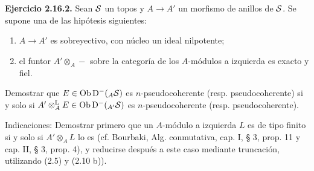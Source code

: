 \textbf{Ejercicio 2.16.2.} Sean \(\sisi{S}{\mathcal S}\) un topos y \(A\to A'\) un morfismo de anillos de \(\sisi{S}{\mathcal S}\). Se supone una de las hipótesis siguientes:
\begin{enumerate}[label=(\roman*)]
\item \(A\to A'\) es sobreyectivo, con núcleo un ideal nilpotente;
\item el funtor \(A'\otimes_A-\) sobre la categoría de los \(A\)-módulos a izquierda es exacto y fiel.
\end{enumerate}
Demostrar que \(E\in\Ob\Dpx^-(_A \sisi{S}{\mathcal S})\) es \(n\)-pseudocoherente (resp. pseudocoherente) si y solo si \(A'\otimes_A^{\mathrm L} E\in\Ob\Dpx^-(_{A'}\sisi{S}{\mathcal S})\) es \(n\)-pseudocoherente (resp. pseudocoherente).

Indicaciones: Demostrar primero que un \(A\)-módulo a izquierda \(L\) es de tipo finito si y solo si \(A'\otimes_A L\) lo es (cf. Bourbaki, Alg. conmutativa, cap. I, § 3, prop. 11 y cap. II, § 3, prop. 4), y reducirse después a este caso mediante truncación, utilizando (2.5) y (2.10 b)).
